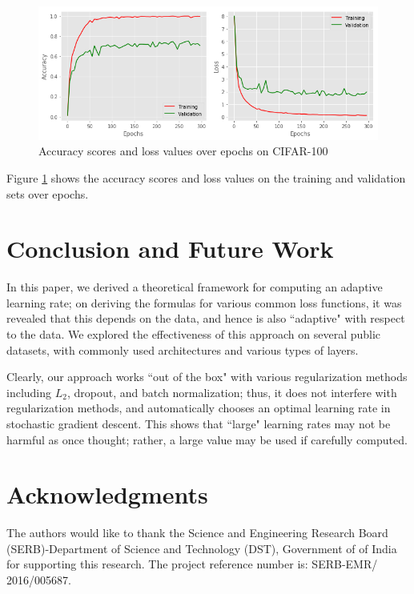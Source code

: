 \documentclass{article}
\begin{document}
\begin{figure}
    \centering
    \includegraphics[scale=0.4]{plot-rn162.png}
    \caption{Accuracy scores and loss values over epochs on CIFAR-100}
    \label{fig:cifar100:2}
\end{figure}

Figure \ref{fig:cifar100:2} shows the accuracy scores and loss values on the training and validation sets over epochs.

\section{Conclusion and Future Work}
In this paper, we derived a theoretical framework for computing an adaptive learning rate; on deriving the formulas for various common loss functions, it was revealed that this depends on the data, and hence is also ``adaptive" with respect to the data. We explored the effectiveness of this approach on several public datasets, with commonly used architectures and various types of layers.

Clearly, our approach works ``out of the box" with various regularization methods including $L_2$, dropout, and batch normalization; thus, it does not interfere with regularization methods, and automatically chooses an optimal learning rate in stochastic gradient descent. This shows that ``large" learning rates may not be harmful as once thought; rather, a large value may be used if carefully computed.


\section*{Acknowledgments}
The authors would like to thank the Science and Engineering Research
Board (SERB)-Department of Science and Technology
(DST), Government of of India for supporting this research.
The project reference number is: SERB-EMR/ 2016/005687.
\vskip 0.2in
\end{document}
